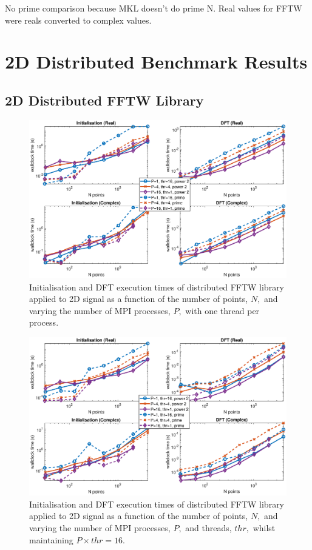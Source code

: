 \documentclass[a4paper]{article}
\begin{document}
No prime comparison because MKL doesn't do prime N. Real values for FFTW were reals converted to complex values.


\section{2D Distributed Benchmark Results}\label{Sec:2DDistr}

\subsection{2D Distributed FFTW Library}\label{Sec:2DDistFFTW}

\begin{figure}[htb]
    \centering
    \includegraphics[width=\linewidth]{../results/fftw_2d_mpi.eps}
  \caption{Initialisation and DFT execution times of distributed FFTW library applied to 2D signal as a function of the
    number of points, $N,$ and varying the number of MPI processes, $P,$ with one thread per process.}
  \label{2DDistFFTW}
\end{figure}

\begin{figure}[htb]
    \centering
    \includegraphics[width=\linewidth]{../results/fftw_2d_mpi_thr.eps}
  \caption{Initialisation and DFT execution times of distributed FFTW library applied to 2D signal as a function of the
    number of points, $N,$ and varying the number of MPI processes, $P,$ and threads, $thr,$ whilst maintaining $P\times thr=16.$}
  \label{2DDistFFTW16}
\end{figure}
\end{document}

